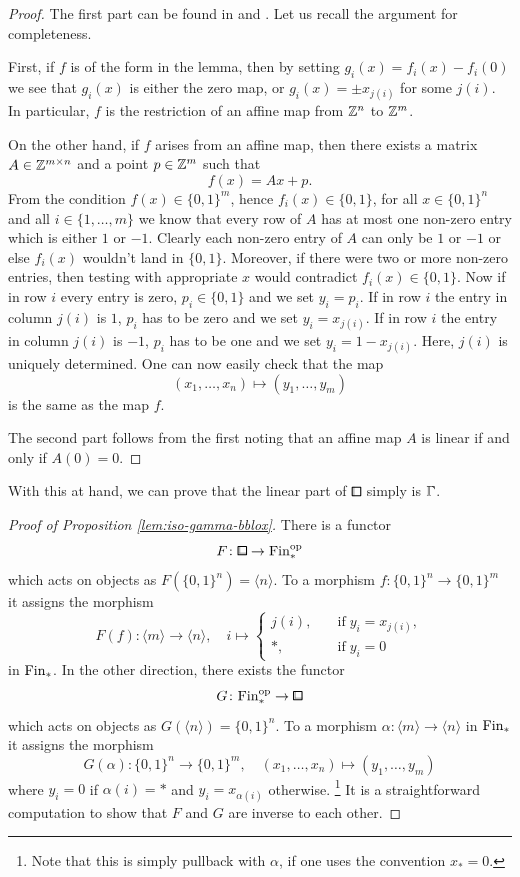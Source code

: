 \begin{proof}
The first part can be found in \cite[Lemma 1.1.3]{Candela2017} and \cite[Remark after Definition 3.1]{Gutman2020}.
Let us recall the argument for completeness.

First, if $f$ is of the form in the lemma, then by setting $g_i(x) = f_i(x) - f_i(0)$
we see that $g_i(x)$ is either the zero map, or $g_i(x) = \pm x_{j(i)}$ for some $j(i)$.
In particular, $f$ is the restriction of an affine map from $\mathbb{Z}^n$ to $\mathbb{Z}^m$.

On the other hand, if $f$ arises from an affine map,
then there exists a matrix $A\in\mathbb{Z}^{m\times n}$ and a point $p\in\mathbb{Z}^m$ such that
\[
    f(x) = Ax + p.
\]
From the condition $f(x)\in\{0,1\}^m$, hence $f_i(x)\in\{0,1\}$, for all $x\in\{0,1\}^n$ and all $i\in\{1,\ldots,m\}$ we know that
every row of $A$ has at most one non-zero entry which is either $1$ or $-1$.
Clearly each non-zero entry of $A$ can only be $1$ or $-1$ or else $f_i(x)$ wouldn't land in $\{0,1\}$.
Moreover, if there were two or more non-zero entries, then testing with appropriate $x$ would contradict $f_i(x)\in\{0,1\}$.
Now if in row $i$ every entry is zero, $p_i\in\{0,1\}$ and we set $y_i = p_i$.
If in row $i$ the entry in column $j(i)$ is $1$, $p_i$ has to be zero and we set $y_i = x_{j(i)}$.
If in row $i$ the entry in column $j(i)$ is $-1$, $p_i$ has to be one and we set $y_i = 1 - x_{j(i)}$.
Here, $j(i)$ is uniquely determined.
One can now easily check that the map
\[
    (x_1,\ldots,x_n) \mapsto (y_1,\ldots,y_m)
\]
is the same as the map $f$.

The second part follows from the first noting that an affine map $A$ is linear if and only if $A(0)=0$.
\end{proof}

With this at hand, we can prove that the linear part of $\bbox$ simply is $\bbGamma$.

\begin{proof}[Proof of Proposition \ref{lem:iso-gamma-bblox}]
There is a functor
\[
    F\colon{\bblox}\to\Fin_\ast^\op
\]
which acts on objects as $F(\{0,1\}^n) = \langle n\rangle$.
To a morphism $f\colon\{0,1\}^n\to\{0,1\}^m$ it assigns the morphism
\[
    F(f)\colon\langle m\rangle\to\langle n\rangle,\quad i\mapsto
        \begin{cases}
            j(i),\quad&\text{if}\; y_i = x_{j(i)}, \\
            \ast,\quad&\text{if}\; y_i = 0
        \end{cases}
\]
in $\mathrm{Fin}_\ast$.
In the other direction, there exists the functor
\[
    G\colon\Fin_\ast^\op\to{\bblox}
\]
which acts on objects as $G(\langle n\rangle) = \{0,1\}^n$.
To a morphism $\alpha\colon\langle m\rangle\to\langle n\rangle$ in $\mathrm{Fin}_\ast$ it assigns the morphism
\[
    G(\alpha)\colon\{0,1\}^n\to\{0,1\}^m,\quad (x_1,\ldots,x_n)\mapsto (y_1,\ldots,y_m)
\]
where $y_i = 0$ if $\alpha(i) = \ast$ and $y_i = x_{\alpha(i)}$ otherwise.%
\footnote{Note that this is simply pullback with $\alpha$, if one uses the convention $x_\ast=0$.}
It is a straightforward computation to show that $F$ and $G$ are inverse to each other.
\end{proof}



